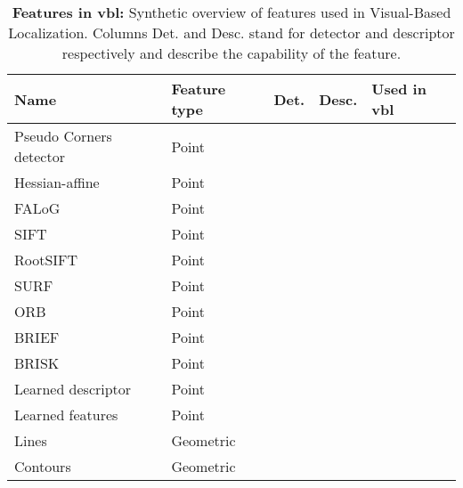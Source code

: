 \begin{landscape}
\begin{table}[t]
	\centering
	\caption[Features in \ac{vbl}]{\label{tab:features_list} \textbf{Features in \ac{vbl}:} Synthetic overview of features used in Visual-Based Localization. Columns Det. and Desc. stand for detector and descriptor respectively and describe the capability of the feature.}
	\renewcommand{\arraystretch}{1.1}
	\scriptsize{
		\begin{tabular}{l l c c l}
			\hline
			\textbf{Name} 			& \textbf{Feature type} 	& \textbf{Det.} 		& \textbf{Desc.} 		& \textbf{Used in \ac{vbl}}\\
			\hline
			\hline
			Pseudo Corners detector \citep{Morago2015}		& Point			& \cmark	& \xmark		& \citep{Morago2015,Morago2016} \\
			Hessian-affine \citep{Mikolajczyk2004}			& Point 		& \cmark	& \xmark		& \citep{Jegou2009,Arandjelovic2012,Li2015,Sattler2016,Arandjelovic2014} \\
			FALoG \citep{Wang2013frif}		& Point			& \cmark	& \xmark		& \citep{Feng2016a} \\
			SIFT \citep{Lowe2004} 			& Point 		& \cmark	& \cmark		&  \citep{Song2016,Schindler2007,Liang2013,Zamir2010,Zamir2014,Nister2006,Yan2016} \\
            RootSIFT \citep{Arandjelovic2013}	& Point 		& \xmark	& \cmark		& \citep{Torii2013,Middelberg2014,Arandjelovic2014,Sattler2016,Torii2015}\\
			SURF \citep{Bay2006} 			& Point 		& \cmark	& \cmark		& \citep{Cummins2008,Li2015,Stumm2015a,Qu2016,Song2016,Valgren2010} \\
			ORB \citep{Rublee2011} 			& Point 		& \cmark	& \cmark		& \citep{Griffith2017} \\
			BRIEF \citep{Calonder2010} & Point		& \xmark	& \cmark		& \citep{Krajnik2014,Krajnik2017a} \\
			BRISK \citep{Leutenegger2011brisk} & Point		& \cmark	& \cmark		& \citep{Feng2016a,Middelberg2014,Muhlfellner2015} \\
			Learned descriptor & Point		& \xmark	& \cmark		& \citep{Carlevaris-Bianco2014,Paulin2015,Krajnik2017a,Piasco2019,Piasco2019a,Taira2018} \\
			Learned features & Point		& \cmark	& \cmark		& \citep{Sarlin2018a, Dusmanu2019} \\
			\hline
			Lines \citep{VC1962}				& Geometric		& \cmark	& \xmark		& \citep{Hays2008,Arth2015,Morago2016,Ramalingam2011} \\
			Contours \citep{canny1986computational}				& Geometric		& \cmark	& \xmark		& \citep{Ramalingam2010,Russell2011} \\

\end{tabular}}
\end{table}
\end{landscape}
